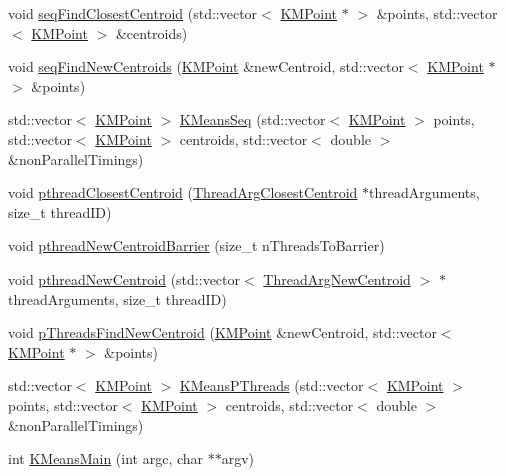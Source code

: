 \begin{DoxyCompactItemize}
void \hyperlink{namespaceKMeans_a51a34cb9e3c9fa1b619342ce80834c7b}{seq\-Find\-Closest\-Centroid} (std\-::vector$<$ \hyperlink{structKMeans_1_1KMPoint}{K\-M\-Point} $\ast$ $>$ \&points, std\-::vector$<$ \hyperlink{structKMeans_1_1KMPoint}{K\-M\-Point} $>$ \&centroids)
\item 
void \hyperlink{namespaceKMeans_a3be77d9de58b3e3151ceb2a48681d40f}{seq\-Find\-New\-Centroids} (\hyperlink{structKMeans_1_1KMPoint}{K\-M\-Point} \&new\-Centroid, std\-::vector$<$ \hyperlink{structKMeans_1_1KMPoint}{K\-M\-Point} $\ast$ $>$ \&points)
\item 
std\-::vector$<$ \hyperlink{structKMeans_1_1KMPoint}{K\-M\-Point} $>$ \hyperlink{namespaceKMeans_a10702545b2f1319336b2789ee42e1bd6}{K\-Means\-Seq} (std\-::vector$<$ \hyperlink{structKMeans_1_1KMPoint}{K\-M\-Point} $>$ points, std\-::vector$<$ \hyperlink{structKMeans_1_1KMPoint}{K\-M\-Point} $>$ centroids, std\-::vector$<$ double $>$ \&non\-Parallel\-Timings)
\item 
void \hyperlink{namespaceKMeans_af1d43ce3d20a17d12527e0fac7832f37}{pthread\-Closest\-Centroid} (\hyperlink{classKMeans_1_1ThreadArgClosestCentroid}{Thread\-Arg\-Closest\-Centroid} $\ast$thread\-Arguments, size\-\_\-t thread\-I\-D)
\item 
void \hyperlink{namespaceKMeans_a760600cbd27b19e04a612fa75b2e3d3b}{pthread\-New\-Centroid\-Barrier} (size\-\_\-t n\-Threads\-To\-Barrier)
\item 
void \hyperlink{namespaceKMeans_a7bbfb7d54cedb05d039f1660792b007d}{pthread\-New\-Centroid} (std\-::vector$<$ \hyperlink{classKMeans_1_1ThreadArgNewCentroid}{Thread\-Arg\-New\-Centroid} $>$ $\ast$thread\-Arguments, size\-\_\-t thread\-I\-D)
\item 
void \hyperlink{namespaceKMeans_abf69c32edce6417d0dce98e983c35af4}{p\-Threads\-Find\-New\-Centroid} (\hyperlink{structKMeans_1_1KMPoint}{K\-M\-Point} \&new\-Centroid, std\-::vector$<$ \hyperlink{structKMeans_1_1KMPoint}{K\-M\-Point} $\ast$ $>$ \&points)
\item 
std\-::vector$<$ \hyperlink{structKMeans_1_1KMPoint}{K\-M\-Point} $>$ \hyperlink{namespaceKMeans_a37946d061f5cdb3de7465fb0dca1a16e}{K\-Means\-P\-Threads} (std\-::vector$<$ \hyperlink{structKMeans_1_1KMPoint}{K\-M\-Point} $>$ points, std\-::vector$<$ \hyperlink{structKMeans_1_1KMPoint}{K\-M\-Point} $>$ centroids, std\-::vector$<$ double $>$ \&non\-Parallel\-Timings)
\item 
int \hyperlink{namespaceKMeans_ab6f8f31e6f0f753d15f544e340cf44d9}{K\-Means\-Main} (int argc, char $\ast$$\ast$argv)
\end{DoxyCompactItemize}

